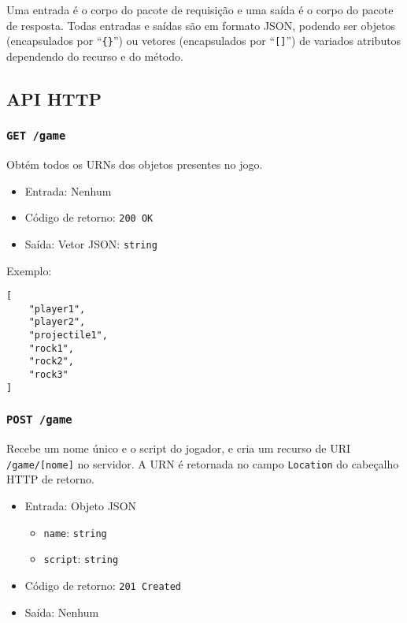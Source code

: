 \documentclass[12pt,a4paper]{article}
\begin{document}
Uma entrada é o corpo do pacote de requisição e uma saída é o corpo do pacote
de resposta. Todas entradas e saídas são em formato JSON, podendo ser objetos
(encapsulados por ``\texttt{\{\}}'') ou vetores (encapsulados por
``\texttt{[]}'') de variados atributos dependendo do recurso e do método.

\subsection{API HTTP}

\subsubsection{\texttt{GET /game}}

Obtém todos os URNs dos objetos presentes no jogo.

\begin{itemize}
	\item Entrada: Nenhum
	\item Código de retorno: \texttt{200 OK}
	\item Saída: Vetor JSON: \texttt{string}
\end{itemize}

Exemplo:

\begin{verbatim}
[
    "player1",
    "player2",
    "projectile1",
    "rock1",
    "rock2",
    "rock3"
]
\end{verbatim}

\subsubsection{\texttt{POST /game}}

Recebe um nome único e o script do jogador, e cria um recurso de URI
\texttt{/game/[nome]} no servidor. A URN é retornada no campo \texttt{Location}
do cabeçalho HTTP de retorno.

\begin{itemize}
	\item Entrada: Objeto JSON
		\begin{itemize}
			\item \texttt{name}: \texttt{string}
			\item \texttt{script}: \texttt{string}
		\end{itemize}
	\item Código de retorno: \texttt{201 Created}
	\item Saída: Nenhum
\end{itemize}
\end{document}
